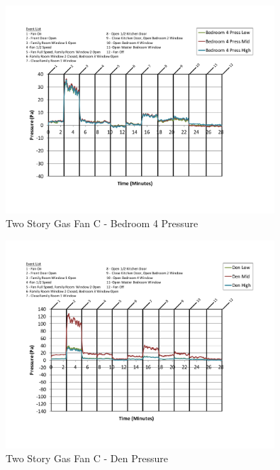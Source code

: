 \documentclass{article}
\begin{document}
\begin{appendices}
	\begin{figure}[H]
		\centering
		\includegraphics[height=3.05in,trim=0.67in 1.1in 0.67in 0.8in,clip=true]{0_Images/Results_Charts/ColdFlow/Two_Story/Gas/C/Bedroom_4_Pressure.pdf}
		\caption{Two Story Gas Fan C - Bedroom 4 Pressure}
	\end{figure}
 

	\begin{figure}[H]
		\centering
		\includegraphics[height=3.05in,trim=0.67in 1.1in 0.67in 0.8in,clip=true]{0_Images/Results_Charts/ColdFlow/Two_Story/Gas/C/Den_Pressure.pdf}
		\caption{Two Story Gas Fan C - Den Pressure}
	\end{figure}
 
	\clearpage


\end{appendices}
\end{document}
